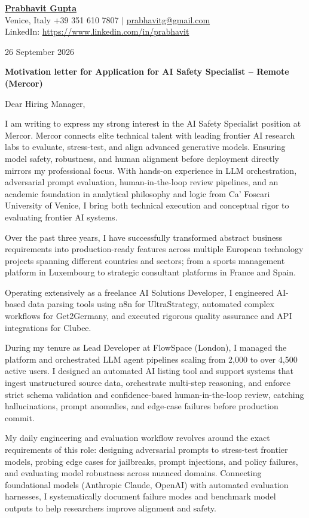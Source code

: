 \documentclass[a4paper,10pt]{article}
\begin{document}
\textbf{\underline{\Large Prabhavit Gupta}}\\[2pt]
Venice, Italy \quad +39 351 610 7807 \quad $\vert$ \quad \href{mailto:prabhavitg@gmail.com}{prabhavitg@gmail.com}\\[1pt]
LinkedIn: \href{https://www.linkedin.com/in/prabhavit}{https://www.linkedin.com/in/prabhavit}

\vspace{2pt}
26 September 2026

\textbf{\large Motivation letter for Application for AI Safety Specialist -- Remote (Mercor)}

Dear Hiring Manager,

I am writing to express my strong interest in the AI Safety Specialist position at Mercor. Mercor connects elite technical talent with leading frontier AI research labs to evaluate, stress-test, and align advanced generative models. Ensuring model safety, robustness, and human alignment before deployment directly mirrors my professional focus. With hands-on experience in LLM orchestration, adversarial prompt evaluation, human-in-the-loop review pipelines, and an academic foundation in analytical philosophy and logic from Ca' Foscari University of Venice, I bring both technical execution and conceptual rigor to evaluating frontier AI systems.

Over the past three years, I have successfully transformed abstract business requirements into production-ready features across multiple European technology projects spanning different countries and sectors; from a sports management platform in Luxembourg to strategic consultant platforms in France and Spain.

Operating extensively as a freelance AI Solutions Developer, I engineered AI-based data parsing tools using n8n for UltraStrategy, automated complex workflows for Get2Germany, and executed rigorous quality assurance and API integrations for Clubee.

During my tenure as Lead Developer at FlowSpace (London), I managed the platform and orchestrated LLM agent pipelines scaling from 2,000 to over 4,500 active users. I designed an automated AI listing tool and support systems that ingest unstructured source data, orchestrate multi-step reasoning, and enforce strict schema validation and confidence-based human-in-the-loop review, catching hallucinations, prompt anomalies, and edge-case failures before production commit.

My daily engineering and evaluation workflow revolves around the exact requirements of this role: designing adversarial prompts to stress-test frontier models, probing edge cases for jailbreaks, prompt injections, and policy failures, and evaluating model robustness across nuanced domains. Connecting foundational models (Anthropic Claude, OpenAI) with automated evaluation harnesses, I systematically document failure modes and benchmark model outputs to help researchers improve alignment and safety.
\end{document}
